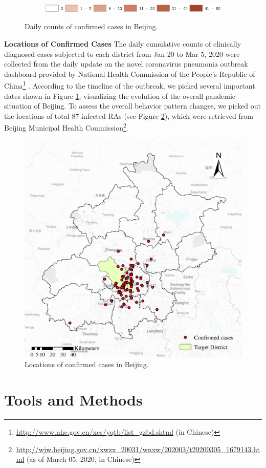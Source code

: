 \documentclass[preprints,article,accept,moreauthors,pdftex]{Definitions/mdpi}
\begin{document}
\begin{figure}[ht]
    \vspace{6pt}
    \begin{subfigure}{0.7\textwidth}
        \includegraphics[width=\textwidth]{Figures/Fig2legend.eps}
    \end{subfigure}
    \caption{Daily counts of confirmed cases in Beijing.}
    \label{fig:number_of_confirmed_cases}
\end{figure}

\textbf{Locations of Confirmed Cases}
The daily cumulative counts of clinically diagnosed cases subjected to each district from Jan 20 to Mar 5, 2020 were collected from the daily update on the novel coronavirus pneumonia outbreak dashboard provided by National Health Commission of the People's Republic of China\footnote{\url{http://www.nhc.gov.cn/xcs/yqtb/list_gzbd.shtml} (in Chinese)} .
According to the timeline \cite{li2020early} of the outbreak, we picked several important dates shown in Figure \ref{fig:number_of_confirmed_cases}, visualizing the evolution of the overall pandemic situation of Beijing.
To assess the overall behavior pattern changes, we picked out the locations of total 87 infected RAs (see Figure \ref{fig:locations_of_confirmed_cases}), which were retrieved from Beijing Municipal Health Commission\footnote{\url{http://wjw.beijing.gov.cn/xwzx_20031/wnxw/202003/t20200305_1679143.html} (as of March 05, 2020, in Chinese)}.

\begin{figure}[ht]
    \centering
    \includegraphics[width=.5\textwidth]{Figures/Plot_location_confirmed_cases.eps}
    \caption{Locations of confirmed cases in Beijing.}
    \label{fig:locations_of_confirmed_cases}
\end{figure}

\section{Tools and Methods}
\end{document}
